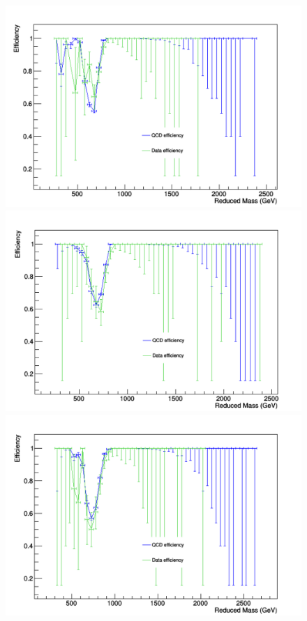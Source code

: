 \begin{figure}[thb!]
\begin{center}
\includegraphics[scale=0.25]{Figures/deta0.pdf}
\includegraphics[scale=0.25]{Figures/deta1.pdf}\\
\includegraphics[scale=0.25]{Figures/deta2.pdf}

\end{center}
\end{figure}
